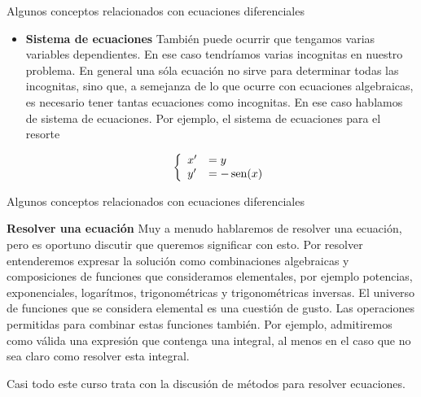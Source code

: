 \documentclass[handout,hyperref={colorlinks=true}]{beamer}
\DeclareMathOperator{\sen}{sen}
\newcommand{\nl}{\onslide<+-> }
\begin{document}
\begin{frame}{Algunos conceptos relacionados con ecuaciones diferenciales}
\begin{itemize}
\nl  \item \textbf{Sistema de ecuaciones} También puede ocurrir  que tengamos varias variables dependientes. En ese caso tendríamos varias incognitas en 
nuestro problema. En general una sóla ecuación no sirve para determinar todas las incognitas, sino que, a semejanza de lo que ocurre con ecuaciones algebraicas, es 
necesario tener tantas ecuaciones como incognitas. En ese caso hablamos de sistema de ecuaciones. Por ejemplo, el sistema de ecuaciones para el resorte

\[\left\{ \begin{array}{l l} x'&=y \\y'&=-\sen(x) \end{array}\right.\]


\end{itemize}

 

\end{frame}


\begin{frame}{Algunos conceptos relacionados con ecuaciones diferenciales}
 
\nl  \textbf{Resolver una ecuación} Muy a menudo hablaremos de resolver una ecuación, pero es oportuno discutir que queremos significar con esto.  
Por resolver entenderemos expresar la solución como combinaciones algebraicas y composiciones de funciones que consideramos elementales, por ejemplo potencias, exponenciales, logarítmos, trigonométricas
y trigonométricas inversas. El universo de funciones que se considera elemental es una cuestión de gusto. Las operaciones permitidas para combinar estas funciones
también. Por ejemplo, admitiremos como válida una expresión que contenga una integral, al menos en el caso que no sea claro como resolver esta integral.

\nl Casi todo este curso trata con la discusión de métodos para resolver ecuaciones.
 

\end{frame}
\end{document}

